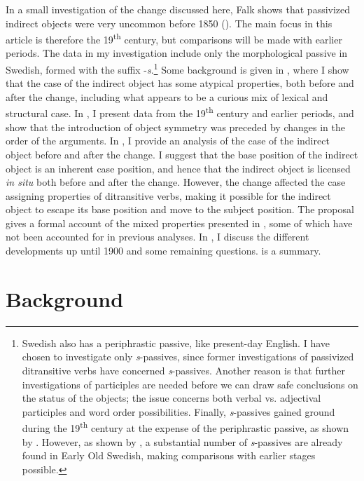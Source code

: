 \documentclass[output=paper]{langscibook}
\begin{document}
In a small investigation of the change discussed here, Falk shows that passivized indirect objects were very uncommon before 1850 (\citeyear[167]{Falk1997}). The main focus in this article is therefore the 19\textsuperscript{th} century, but comparisons will be made with earlier periods. The data in my investigation include only the morphological passive in Swedish, formed with the suffix -\textit{s}.\footnote{Swedish also has a periphrastic passive, like present-day English. I have chosen to investigate only \textit{s}{}-passives, since former investigations of passivized ditransitive verbs have concerned \textit{s}{}-passives. Another reason is that further investigations of participles are needed before we can draw safe conclusions on the status of the objects; the issue concerns both verbal vs. adjectival participles and word order possibilities. Finally, \textit{s}{}-passives gained ground during the 19\textsuperscript{th} century at the expense of the periphrastic passive, as shown by \citet{Kirri1975}. However, as shown by \citet{Holm1952}, a substantial number of \textit{s}{}-passives are already found in Early Old Swedish, making comparisons with earlier stages possible.} Some background is given in , where I show that the case of the indirect object has some atypical properties, both before and after the change, including what appears to be a curious mix of lexical and structural case. In , I present data from the 19\textsuperscript{th} century and earlier periods, and show that the introduction of object symmetry was preceded by changes in the order of the arguments. In , I provide an analysis of the case of the indirect object before and after the change. I suggest that the base position of the indirect object is an inherent case position, and hence that the indirect object is licensed \textit{in situ} both before and after the change. However, the change affected the case assigning properties of ditransitive verbs, making it possible for the indirect object to escape its base position and move to the subject position. The proposal gives a formal account of the mixed properties presented in , some of which have not been accounted for in previous analyses. In , I discuss the different developments up until 1900 and some remaining questions.  is a summary.

\section{Background}\label{sec:falk:2}
\end{document}
